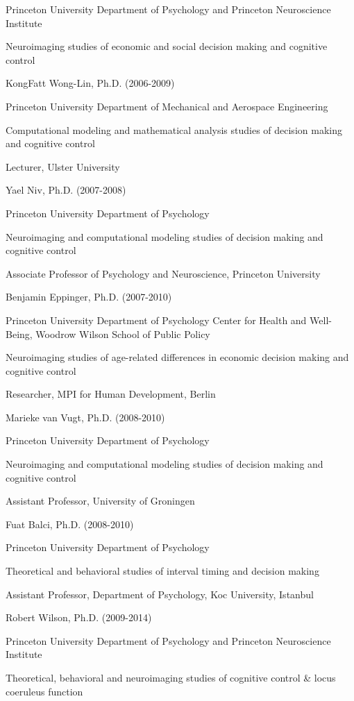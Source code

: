 \documentclass[10 pt]{article}
\begin{document}
Princeton University Department of Psychology and Princeton Neuroscience Institute

Neuroimaging studies of economic and social decision making and cognitive control
    \medskip

KongFatt Wong-Lin, Ph.D. (2006-2009)

Princeton University Department of Mechanical and Aerospace Engineering

Computational modeling and mathematical analysis studies of decision making and cognitive control

Lecturer, Ulster University
    \medskip

Yael Niv, Ph.D. (2007-2008)

Princeton University Department of Psychology

Neuroimaging and computational modeling studies of decision making and cognitive control

Associate Professor of Psychology and Neuroscience, Princeton University
    \medskip

Benjamin Eppinger, Ph.D. (2007-2010)

Princeton University Department of Psychology
Center for Health and Well-Being, Woodrow Wilson School of Public Policy

Neuroimaging studies of age-related differences in economic decision making and cognitive control

Researcher, MPI for Human Development, Berlin
    \medskip

Marieke van Vugt, Ph.D. (2008-2010)

Princeton University Department of Psychology

Neuroimaging and computational modeling studies of decision making and cognitive control

Assistant Professor, University of Groningen
    \medskip

Fuat Balci, Ph.D. (2008-2010)

Princeton University Department of Psychology

Theoretical and behavioral studies of interval timing and decision making

Assistant Professor, Department of Psychology, Koc University, Istanbul
    \medskip

Robert Wilson, Ph.D. (2009-2014)

Princeton University Department of Psychology and Princeton Neuroscience Institute

Theoretical, behavioral and neuroimaging studies of cognitive control \& locus coeruleus function
\end{document}
